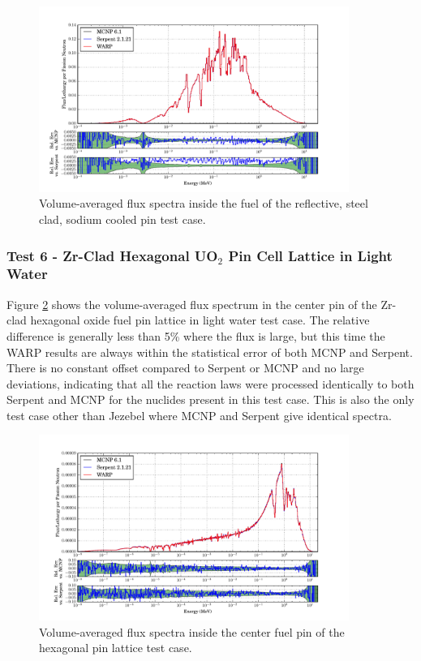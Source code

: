 \documentclass[preprint,12pt]{elsarticle}
\begin{document}
\begin{figure}[h!]
\centering
\includegraphics[width=0.9\textwidth,trim= 1cm 0cm 1cm 0cm]{graphics/sodiumpin_spec.pdf}
\caption{Volume-averaged flux spectra inside the fuel of the reflective, steel clad, sodium cooled pin test case. \label{sodiumpin_spec} }
\end{figure}


\newpage
\subsubsection{Test 6 - Zr-Clad Hexagonal UO$_2$ Pin Cell Lattice in Light Water}

Figure \ref{assembly-lw_spec} shows the volume-averaged flux spectrum in the center pin of the Zr-clad hexagonal oxide fuel pin lattice in light water test case. The relative difference is generally less than 5\% where the flux is large, but this time the WARP results are always within the statistical error of both MCNP and Serpent.  There is no constant offset compared to Serpent or MCNP and no large deviations, indicating that all the reaction laws were processed identically to both Serpent and MCNP for the nuclides present in this test case.  This is also the only test case other than Jezebel where MCNP and Serpent give identical spectra.

\begin{figure}[h!]
\centering
\includegraphics[width=0.9\textwidth,trim= 1cm 0cm 1cm 0cm]{graphics/assembly-lw_spec.pdf}
\caption{Volume-averaged flux spectra inside the center fuel pin of the hexagonal pin lattice test case. \label{assembly-lw_spec} }
\end{figure}
\end{document}
